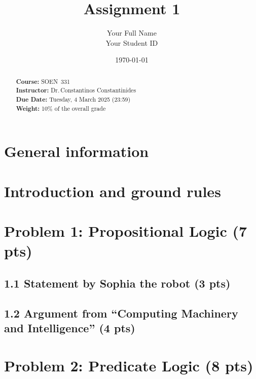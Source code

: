 \documentclass[11pt]{article}
\title{Assignment 1}
\author{Your Full Name \\
        Your Student ID}
\date{\today}
\begin{document}
\maketitle

\begin{abstract}
\noindent
\textbf{Course:} SOEN~331 \\
\textbf{Instructor:} Dr.\,Constantinos Constantinides \\
\textbf{Due Date:} Tuesday, 4 March 2025 (23:59) \\
\textbf{Weight:} 10\% of the overall grade
\end{abstract}

\vspace{1em}

\section*{General information}

\section*{Introduction and ground rules}

\newpage
\section{Problem 1: Propositional Logic (7 pts)}

\subsection*{1.1 Statement by Sophia the robot (3 pts)}

\subsection*{1.2 Argument from “Computing Machinery and Intelligence” (4 pts)}

\newpage
\section{Problem 2: Predicate Logic (8 pts)}
\end{document}
